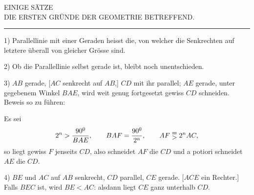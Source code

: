 \clearpage
{}
\begin{center}
EINIGE SÄTZE\\
DIE ERSTEN GRÜNDE DER GEOMETRIE BETREFFEND.
\end{center}

\medskip
\begin{center}
\rule{0.15\textwidth}{0.4pt}
\end{center}
\medskip

1) Parallellinie mit einer Geraden heisst die, von welcher die
Senkrechten auf letztere überall von gleicher Grösse sind.

2) Ob die Parallellinie selbst gerade ist, bleibt noch unentschieden.

3) $AB$ gerade, [$AC$ senkrecht auf $AB$,] $CD$ mit ihr parallel;
$AE$ gerade, unter gegebenem Winkel $BAE$, wird weit genug fortgesetzt
gewiss $CD$ schneiden. Beweis so zu führen:

\begin{center}\end{center}

Es sei
\[
2^n > \frac{90^{0}}{BAE}, \qquad BAF = \frac{90^{0}}{2^n}, \qquad
AF \EqualsOverGreater{} 2^n AC, 
\]
so liegt gewiss $F$ jenseits $CD$, also schneidet $AF$ die $CD$ und
a potiori schneidet $AE$ die $CD$.

4) $BE$ und $AC$ auf $AB$ senkrecht, $CD$ parallel, $CE$ gerade.
[$ACE$ ein Rechter.] Falls $BEC$  ist, wird $BE < AC$: alsdann
liegt $CE$ ganz unterhalb $CD$.

\begin{center}\end{center}

